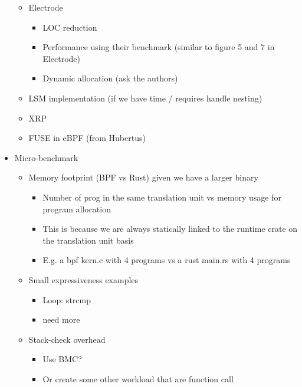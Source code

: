 \begin{itemize}
\begin{itemize}
\begin{itemize}
\begin{itemize}
                        \end{itemize}
                \end{itemize}
            \item Electrode
                \begin{itemize}
                    \item LOC reduction
                    \item Performance using their benchmark (similar to figure
                        5 and 7 in Electrode)
                    \item Dynamic allocation (ask the authors)
                \end{itemize}
            \item LSM implementation (if we have time / requires handle
                nesting)
            \item XRP
            \item FUSE in eBPF (from Hubertus)
        \end{itemize}
    \item Micro-benchmark
        \begin{itemize}
            \item Memory footprint (BPF vs Rust) given we have a larger binary
                \begin{itemize}
                    \item Number of prog in the same translation unit vs memory
                        usage for program allocation
                    \item This is because we are always statically linked to
                        the runtime crate on the translation unit basis
                    \item E.g. a bpf kern.c with 4 programs vs a rust main.rs
                        with 4 programs
                \end{itemize}
            \item Small expressiveness examples
                \begin{itemize}
                    \item Loop: strcmp
                    \item need more
                \end{itemize}
            \item Stack-check overhead
                \begin{itemize}
                    \item Use BMC?
                    \item Or create some other workload that are function call

\end{itemize}
\end{itemize}
\end{itemize}
